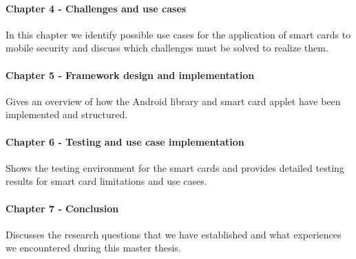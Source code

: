 \paragraph{Chapter 4 - Challenges and use cases}
In this chapter we identify possible use cases for the application of smart cards to mobile security and discuss which challenges must be solved to realize them.

\paragraph{Chapter 5 - Framework design and implementation}
Gives an overview of how the Android library and smart card applet have been implemented and structured.

\paragraph{Chapter 6 - Testing and use case implementation}
Shows the testing environment for the smart cards and provides detailed testing results for smart card limitations and use cases.

\paragraph{Chapter 7 - Conclusion}
Discusses the research questions that we have established and what experiences we encountered during this master thesis.
